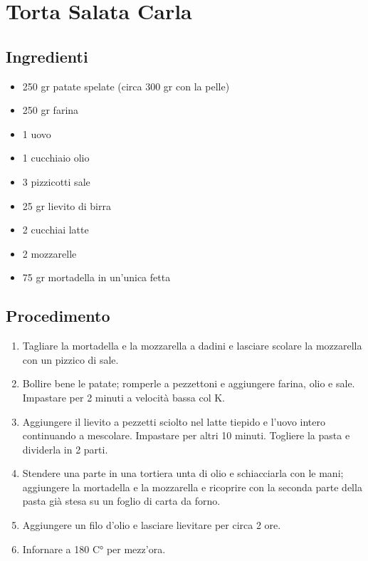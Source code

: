 \section{Torta Salata Carla}
\subsection{Ingredienti}
\begin{itemize}
\item 250 gr patate spelate (circa 300 gr con la pelle)  
\item 250 gr farina  
\item 1 uovo  
\item 1 cucchiaio olio  
\item 3 pizzicotti sale  
\item 25 gr lievito di birra  
\item 2 cucchiai latte  
\item 2 mozzarelle  
\item 75 gr mortadella in un'unica fetta
\end{itemize}
\subsection{Procedimento}
\begin{enumerate}
\item  Tagliare la mortadella e la mozzarella a dadini e lasciare scolare la mozzarella con un pizzico di sale.  
\item  Bollire bene le patate; romperle a pezzettoni e aggiungere farina, olio e sale. Impastare per 2 minuti a velocità bassa col K.  
\item  Aggiungere il lievito a pezzetti sciolto nel latte tiepido e l'uovo intero continuando a mescolare. Impastare per altri 10 minuti. Togliere la pasta e dividerla in 2 parti.   
\item  Stendere una parte in una tortiera unta di olio e schiacciarla con le mani; aggiungere la mortadella e la mozzarella e ricoprire con la seconda parte della pasta già stesa su un foglio di carta da forno.  
\item  Aggiungere un filo d'olio e lasciare lievitare per circa 2 ore.  
\item  Infornare a 180 C° per mezz'ora.
\end{enumerate}

